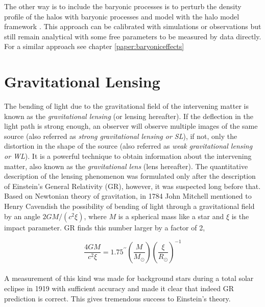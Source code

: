 The other way is to include the baryonic processes is to perturb the density profile 
of the halos with baryonic processes and model with the halo model framework 
\cite{2014arXiv1410.6826M}.  This approach can 
be calibrated with simulations or observations but still remain analytical with some 
free parameters to be measured by data directly. 
For a similar approach see chapter \ref{paper:baryoniceffects}



\clearpage
\section{Gravitational Lensing}
The bending of light due to the gravitational field of the intervening matter is known as
the {\it gravitational lensing} (or lensing hereafter). If the deflection in the light
path is strong enough, an observer will observe multiple images of the same source 
(also referred as {\it strong gravitational lensing or SL}), 
if not, only the distortion in the shape of the source  
(also referred as {\it weak gravitational lensing or WL}). It is a powerful technique to 
obtain information about the intervening matter, also known as the {\it gravitational
lens} (lens hereafter). The quantitative description of the lensing phenomenon
was formulated only after the description of Einstein's General Relativity (GR), however,
it was suspected long before that. Based on Newtonian theory of gravitation, in 1784 
John Mitchell mentioned to Henry Cavendish the possibility of bending of light
through a gravitational field by an angle $ 2GM/(c^2 \xi)$, where $M$ is a spherical
mass like a star and $\xi$ is the impact parameter. GR finds this number larger 
by a factor of 2,

\begin{equation}
	\dfrac{4GM}{c^2 \xi} = 1.75^{\prime \prime} 
					\left(\dfrac{M}{M_{\odot}}\right)
					\left(\dfrac{\xi}{R_{\odot}} \right)^{-1}
\end{equation}
\\
A measurement of this kind was made for background stars during a total solar eclipse
in 1919 with sufficient accuracy and made it clear that indeed GR prediction is 
correct. This gives tremendous success to Einstein's theory. 

